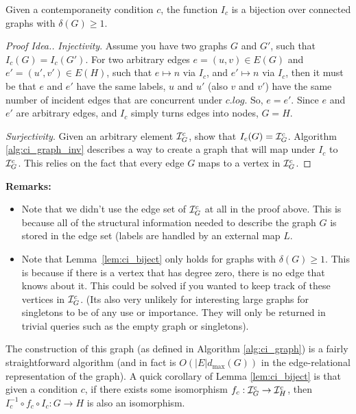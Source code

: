
\begin{lemma}
  \label{lem:ci_biject}
  Given a contemporaneity condition $c$, the function $I_c$ is a bijection over
  connected graphs with $\delta(G) \geq 1$.
\end{lemma}

\begin{proof}[Proof Idea.]\hfill
  
  \textit{Injectivity}. Assume you have two graphs $G$ and $G'$, such that $I_c(G)
  = I_c(G')$. For two arbitrary edges $e = (u,v) \in E(G)$ and $e' = (u',v') \in
  E(H)$, such that $e \mapsto n$ via $I_c$, and $e' \mapsto n$ via $I_c$, then
  it must be that $e$ and $e'$ have the same labels, $u$ and $u'$ (also $v$ and
  $v'$) have the same number of incident edges that are concurrent under
  $c.log$. So, $e = e'$.  Since $e$ and $e'$ are arbitrary edges, and $I_c$
  simply turns edges into nodes, $G = H$.

  \textit{Surjectivity}. Given an arbitrary element $\mathcal{I}^c_G$, show that $I_c(G) =
  \mathcal{I}^c_G$. Algorithm \ref{alg:ci_graph_inv} describes a way to create a graph
  that will map under $I_c$ to $\mathcal{I}^c_G$. This relies on the fact that every
  edge $G$ maps to a vertex in $\mathcal{I}^c_G$.
\end{proof}

\noindent \textbf{Remarks:}
\begin{itemize}
  \item Note that we didn't use the edge set of $\mathcal{I}^c_G$ at all in the proof
    above. This is because all of the structural information needed to describe
    the graph $G$ is stored in the edge set (labels are handled by an external
    map $L$.
  \item Note that Lemma~\ref{lem:ci_biject} only holds for graphs with
    $\delta(G) \geq 1$. This is because if there is a vertex that has degree
    zero, there is no edge that knows about it. This could be solved if you
    wanted to keep track of these vertices in $\mathcal{I}^c_G$. (Its also very unlikely
    for interesting large graphs for singletons to be of any use or
    importance. They will only be returned in trivial queries such as the empty
    graph or singletons).
\end{itemize}

The construction of this graph (as defined in Algorithm \ref{alg:ci_graph}) is a
fairly straightforward algorithm (and in fact is $O(|E|d_{\max}(G))$ in the
edge-relational representation of the graph). A quick corollary of Lemma
\ref{lem:ci_biject} is that given a condition $c$, if there exists some
isomorphism $f_c : \mathcal{I}^c_G \to \mathcal{I}^c_H$, then $I_c^{-1} \circ f_c \circ I_c : G
\to H$ is also an isomorphism.

